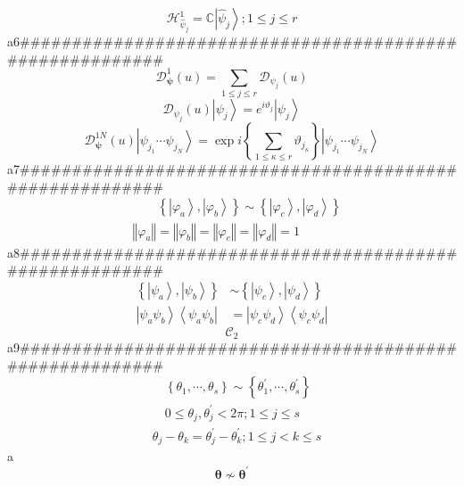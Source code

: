 \documentclass[aps,preprint]{revtex4}%
\begin{document}
\[
\mathcal{H}_{\hat{\psi}_{j}}^{1}=\mathbb{C}\left\vert \hat{\psi}%
_{j}\right\rangle ;1\leq j\leq r
\]
a6\#\#\#\#\#\#\#\#\#\#\#\#\#\#\#\#\#\#\#\#\#\#\#\#\#\#\#\#\#\#\#\#\#\#\#\#\#\#\#\#\#\#\#\#\#\#\#\#\#\#\#\#\#\#\#\#\#%
\[
\mathcal{D}_{\mathbf{\psi}}^{1}\left(  u\right)  =\sum_{1\leq j\leq
r}\mathcal{D}_{\psi_{j}}\left(  u\right)
\]%
\[
\mathcal{D}_{\psi_{j}}\left(  u\right)  \left\vert \psi_{j}\right\rangle
=e^{i\vartheta_{j}}\left\vert \psi_{j}\right\rangle
\]%
\[
\mathcal{D}_{\mathbf{\psi}}^{1N}\left(  u\right)  \left\vert \psi_{j_{1}%
}\cdots\psi_{j_{N}}\right\rangle =\exp i\left\{  \sum_{1\leq\kappa\leq
r}\vartheta_{j_{\kappa}}\right\}  \left\vert \psi_{j_{1}}\cdots\psi_{j_{N}%
}\right\rangle
\]
a7\#\#\#\#\#\#\#\#\#\#\#\#\#\#\#\#\#\#\#\#\#\#\#\#\#\#\#\#\#\#\#\#\#\#\#\#\#\#\#\#\#\#\#\#\#\#\#\#\#\#\#\#\#\#\#\#\#%
\begin{align*}
&  \qquad\left\{  \left\vert \varphi_{a}\right\rangle ,\left\vert \varphi
_{b}\right\rangle \right\}  \sim\left\{  \left\vert \varphi_{c}\right\rangle
,\left\vert \varphi_{d}\right\rangle \right\} \\
&  \left\Vert \varphi_{a}\right\Vert =\left\Vert \varphi_{b}\right\Vert
=\left\Vert \varphi_{c}\right\Vert =\left\Vert \varphi_{d}\right\Vert =1
\end{align*}
a8\#\#\#\#\#\#\#\#\#\#\#\#\#\#\#\#\#\#\#\#\#\#\#\#\#\#\#\#\#\#\#\#\#\#\#\#\#\#\#\#\#\#\#\#\#\#\#\#\#\#\#\#\#\#\#\#\#%
\begin{align*}
\left\{  \left\vert \psi_{a}\right\rangle ,\left\vert \psi_{b}\right\rangle
\right\}   &  \sim\left\{  \left\vert \psi_{c}\right\rangle ,\left\vert
\psi_{d}\right\rangle \right\} \\
\left\vert \psi_{a}\psi_{b}\right\rangle \left\langle \psi_{a}\psi
_{b}\right\vert  &  =\left\vert \psi_{c}\psi_{d}\right\rangle \left\langle
\psi_{c}\psi_{d}\right\vert
\end{align*}%
\[
\mathcal{C}_{2}%
\]
a9\#\#\#\#\#\#\#\#\#\#\#\#\#\#\#\#\#\#\#\#\#\#\#\#\#\#\#\#\#\#\#\#\#\#\#\#\#\#\#\#\#\#\#\#\#\#\#\#\#\#\#\#\#\#\#\#\#%
\begin{align*}
&  \left.  \quad\right.  \left\{  \theta_{1},\cdots,\theta_{s}\right\}
\sim\left\{  \theta_{1}^{\prime},\cdots,\theta_{s}^{\prime}\right\} \\
&  \left.  \quad\right.  0\leq\theta_{j},\theta_{j}^{\prime}<2\pi;1\leq j\leq
s\\
&  \theta_{j}-\theta_{k}=\theta_{j}^{\prime}-\theta_{k}^{\prime};1\leq j<k\leq
s
\end{align*}
a%
\[
\mathbf{\theta\nsim\theta}^{\prime}%
\]
\end{document}
